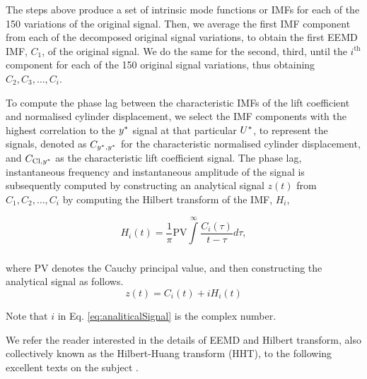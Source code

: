\documentclass[oneside]{utmthesis}
\begin{document}
The steps above produce a set of intrinsic mode functions or IMFs for each of the 150 variations of the original signal. Then, we average the first IMF component from each of the decomposed original signal variations, to obtain the first EEMD IMF, $C_{1}$, of the original signal. We do the same for the second, third, until the $i^{\text{th}}$ component for each of the 150 original signal variations, thus obtaining $C_{2},C_{3},\dots,C_{i}$.

To compute the phase lag between the characteristic IMFs of the lift coefficient and normalised cylinder displacement, we select the IMF components with the highest correlation to the $y^{*}$ signal at that particular $U^{*}$, to represent the signals, denoted as $C_{y^{*},y^{*}}$ for the characteristic normalised cylinder displacement, and $C_{\text{Cl},y^{*}}$ as the characteristic lift coefficient signal. The phase lag, instantaneous frequency and instantaneous amplitude of the signal is subsequently computed by constructing an analytical signal $z \left( t \right)$ from $C_{1},C_{2},\dots,C_{i}$ by computing the Hilbert transform of the IMF, $H_{i}$,

\begin{equation}
  H_{i} \left( t \right) = \frac{1}{\pi} \text{PV} \int\limits_{}^{\infty} \frac{C_{i} \left( \tau \right)}{t - \tau} d\tau,
  \label{eq:hilbertTransform}
\end{equation}

\noindent where PV denotes the Cauchy principal value, and then constructing the analytical signal as follows.
\begin{equation}
  z \left( t \right) = C_{i} \left( t \right) + i H_{i} \left( t \right)
  \label{eq:analiticalSignal}
\end{equation}

\noindent Note that $i$ in Eq. \ref{eq:analiticalSignal} is the complex number.

We refer the reader interested in the details of EEMD and Hilbert transform, also collectively known as the Hilbert-Huang transform (HHT), to the following excellent texts on the subject \citep{Huang2005,Huang2014}.
\end{document}
